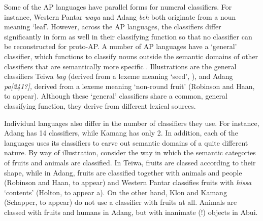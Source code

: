 Some of the AP languages have parallel forms for numeral classifiers. For instance, Western Pantar \textit{waya} and Adang \textit{beh} both originate from a noun meaning `leaf'. However, across the AP languages, the classifiers differ significantly in form as well in their classifying function so that no classifier can be reconstructed for proto-AP. A number of AP languages have a `general' classifier, which functions to classify nouns outside the semantic domains of other classifiers that are semantically more specific \citep[cf.][]{ZubinEtAl1993}. Illustrations are the general classifiers Teiwa \textit{bag} (derived from a lexeme meaning `seed', \citet{Klamer2014,Klamertaa}), and Adang \textit{pa[241?],} derived from a lexeme meaning `non-round fruit' (Robinson and Haan, to appear). Although these `general' classifiers share a common, general classifying function, they derive from different lexical sources.

Individual languages also differ in the number of classifiers they use. For instance, Adang has 14 classifiers, while Kamang has only 2.  In addition, each of the languages uses its classifiers to carve out semantic domains of a quite different nature. By way of illustration, consider the way in which the semantic categories of fruits and animals are classified. In Teiwa, fruits are classed according to their shape, while in Adang, fruits are classified together with animals and people (Robinson and Haan, to appear) and Western Pantar classifies fruits with \textit{hissa} `contents' (Holton, to appear a). On the other hand, Klon \citep{Baird2008} and Kamang (Schapper, to appear) do not use a classifier with fruits at all. Animals are classed with fruits and humans in Adang, but with inanimate (!) objects in Abui.

